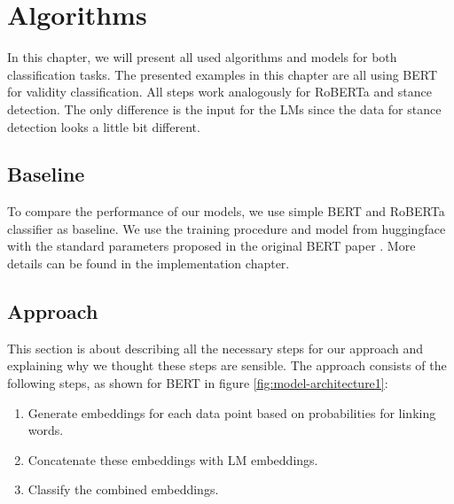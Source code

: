 \section{Algorithms}
In this chapter, we will present all used algorithms and models for both classification tasks. The presented examples in this chapter are all using BERT for validity classification. All steps work analogously for RoBERTa and stance detection. The only difference is the input for the LMs since the data for stance detection looks a little bit different.

\subsection{Baseline}
To compare the performance of our models, we use simple BERT and RoBERTa classifier \cite{bert, roberta} as baseline. We use the training procedure and model from huggingface \cite{berttraining} with the standard parameters proposed in the original BERT paper \cite{bert}. More details can be found in the implementation chapter.

\subsection{Approach}

This section is about describing all the necessary steps for our approach and explaining why we thought these steps are sensible. The approach consists of the following steps, as shown for BERT in figure \ref{fig:model-architecture1}:

\begin{enumerate}
	\item Generate embeddings for each data point based on probabilities for linking words.
	\item Concatenate these embeddings with LM embeddings.
	\item Classify the combined embeddings.
\end{enumerate}

